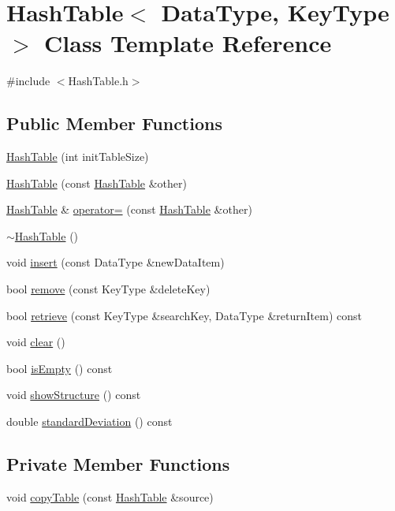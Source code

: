 \hypertarget{class_hash_table}{\section{Hash\+Table$<$ Data\+Type, Key\+Type $>$ Class Template Reference}
\label{class_hash_table}
}


{\ttfamily \#include $<$Hash\+Table.\+h$>$}

\subsection*{Public Member Functions}
\begin{DoxyCompactItemize}
\item 
\hyperlink{class_hash_table_a103b09f30dbac0fe92fc2f1192feb0c1}{Hash\+Table} (int init\+Table\+Size)
\item 
\hyperlink{class_hash_table_a5da00f8a0dc9dc745675a96eac228049}{Hash\+Table} (const \hyperlink{class_hash_table}{Hash\+Table} \&other)
\item 
\hyperlink{class_hash_table}{Hash\+Table} \& \hyperlink{class_hash_table_add76a73a92b81a2d54c20078d4a76546}{operator=} (const \hyperlink{class_hash_table}{Hash\+Table} \&other)
\item 
\hyperlink{class_hash_table_ae25eb9c66b9bce8c9c04f18e22688a15}{$\sim$\+Hash\+Table} ()
\item 
void \hyperlink{class_hash_table_adc8f2be061729bdc5ecb171b54304e17}{insert} (const Data\+Type \&new\+Data\+Item)
\item 
bool \hyperlink{class_hash_table_a46d3f8ad70fd80dc7aa64f50676ef7a5}{remove} (const Key\+Type \&delete\+Key)
\item 
bool \hyperlink{class_hash_table_ad4ee3ff641daa330260a48de29492e66}{retrieve} (const Key\+Type \&search\+Key, Data\+Type \&return\+Item) const 
\item 
void \hyperlink{class_hash_table_a57f581334e35d45a8822c03edc0fcca6}{clear} ()
\item 
bool \hyperlink{class_hash_table_a101e211a7fca37cd90722e15df2fc571}{is\+Empty} () const 
\item 
void \hyperlink{class_hash_table_a8b875e57f71a5bbba394e42361fb9fb4}{show\+Structure} () const 
\item 
double \hyperlink{class_hash_table_a4db2d920fd7c632f5b4b1bacd503bbf1}{standard\+Deviation} () const 
\end{DoxyCompactItemize}
\subsection*{Private Member Functions}
\begin{DoxyCompactItemize}
\item 
void \hyperlink{class_hash_table_a300302ed45228f07c21ad8bf1d852fdd}{copy\+Table} (const \hyperlink{class_hash_table}{Hash\+Table} \&source)
\end{DoxyCompactItemize}
